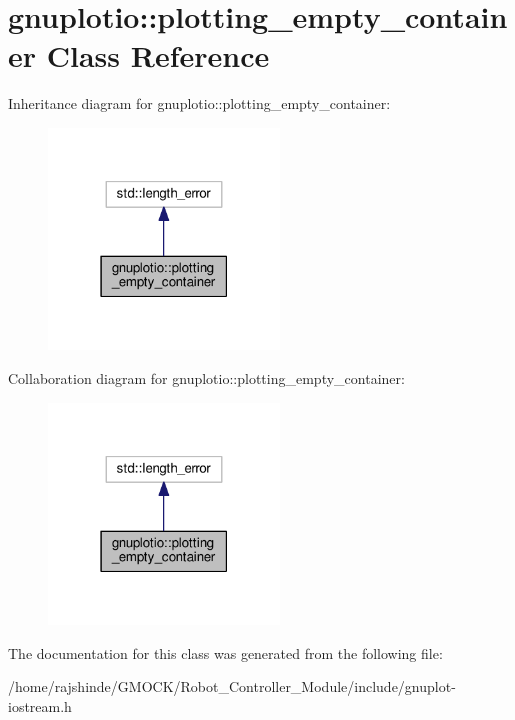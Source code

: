 \hypertarget{classgnuplotio_1_1plotting__empty__container}{}\section{gnuplotio\+:\+:plotting\+\_\+empty\+\_\+container Class Reference}
\label{classgnuplotio_1_1plotting__empty__container}


Inheritance diagram for gnuplotio\+:\+:plotting\+\_\+empty\+\_\+container\+:
\nopagebreak
\begin{figure}[H]
\begin{center}
\leavevmode
\includegraphics[width=174pt]{classgnuplotio_1_1plotting__empty__container__inherit__graph}
\end{center}
\end{figure}


Collaboration diagram for gnuplotio\+:\+:plotting\+\_\+empty\+\_\+container\+:
\nopagebreak
\begin{figure}[H]
\begin{center}
\leavevmode
\includegraphics[width=174pt]{classgnuplotio_1_1plotting__empty__container__coll__graph}
\end{center}
\end{figure}


The documentation for this class was generated from the following file\+:\begin{DoxyCompactItemize}
\item 
/home/rajshinde/\+G\+M\+O\+C\+K/\+Robot\+\_\+\+Controller\+\_\+\+Module/include/gnuplot-\/iostream.\+h\end{DoxyCompactItemize}
